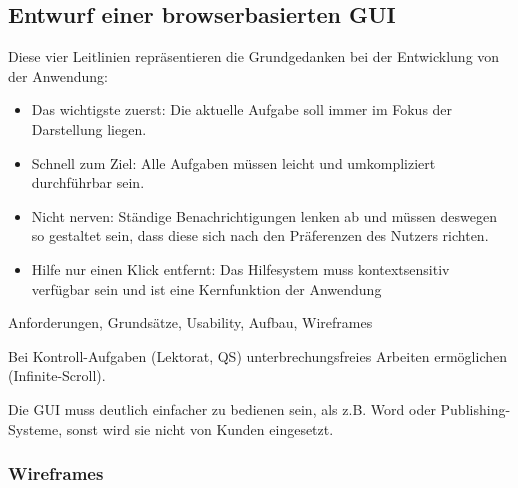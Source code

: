 \subsection{Entwurf einer browserbasierten GUI}\label{l:entwurf-gui}

Diese vier Leitlinien repräsentieren die Grundgedanken bei der Entwicklung von der Anwendung:

\begin{itemize}
\item{Das wichtigste zuerst: Die aktuelle Aufgabe soll immer im Fokus der Darstellung liegen.}
\item{Schnell zum Ziel: Alle Aufgaben müssen leicht und umkompliziert durchführbar sein.}
\item{Nicht nerven: Ständige Benachrichtigungen lenken ab und müssen deswegen so gestaltet sein, dass diese sich nach den Präferenzen des Nutzers richten.}
\item{Hilfe nur einen Klick entfernt: Das Hilfesystem muss kontextsensitiv verfügbar sein und ist eine Kernfunktion der Anwendung}
\end{itemize}

Anforderungen, Grundsätze, Usability, Aufbau, Wireframes

Bei Kontroll-Aufgaben (Lektorat, QS) unterbrechungsfreies Arbeiten ermöglichen (Infinite-Scroll).

Die GUI muss deutlich einfacher zu bedienen sein, als z.B. Word oder Publishing-Systeme, sonst wird sie nicht von Kunden eingesetzt.

\subsubsection{Wireframes}